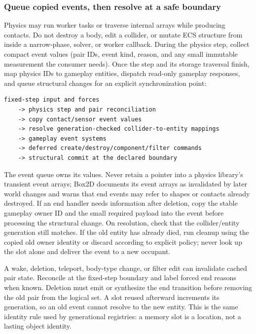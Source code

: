 \subsubsection{Queue copied events, then resolve at a safe boundary}\label{05-engine-i-ch017-queue-copied-events-then-resolve-at-a-safe-boundary}

\hypertarget{05-engine-i-ch017-queue-copied-events-then-resolve-at-a-safe-boundary}{}

Physics may run worker tasks or traverse internal arrays while producing contacts. Do not destroy a body, edit a collider, or mutate ECS structure from inside a narrow-phase, solver, or worker callback. During the physics step, collect compact event values (pair IDs, event kind, reason, and any small immutable measurement the consumer needs). Once the step and its storage traversal finish, map physics IDs to gameplay entities, dispatch read-only gameplay responses, and queue structural changes for an explicit synchronization point:

\begin{verbatim}
fixed-step input and forces
    -> physics step and pair reconciliation
    -> copy contact/sensor event values
    -> resolve generation-checked collider-to-entity mappings
    -> gameplay event systems
    -> deferred create/destroy/component/filter commands
    -> structural commit at the declared boundary
\end{verbatim}

The event queue owns its values. Never retain a pointer into a physics library's transient event arrays; Box2D documents its event arrays as invalidated by later world changes and warns that end events may refer to shapes or contacts already destroyed. If an end handler needs information after deletion, copy the stable gameplay owner ID and the small required payload into the event before processing the structural change. On resolution, check that the collider/entity generation still matches. If the old entity has already died, run cleanup using the copied old owner identity or discard according to explicit policy; never look up the slot alone and deliver the event to a new occupant.

A wake, deletion, teleport, body-type change, or filter edit can invalidate cached pair state. Reconcile at the fixed-step boundary and label forced end reasons when known. Deletion must emit or synthesize the end transition before removing the old pair from the logical set. A slot reused afterward increments its generation, so an old  event cannot resolve to the new  entity. This is the same identity rule used by generational registries: a memory slot is a location, not a lasting object identity.

